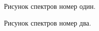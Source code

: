 \documentclass[a4paper,fleqn]{cas-dc}
\begin{document}
\begin{figure}[ht]
    \caption{Рисунок спектров номер один.}
    \label{Ris_5_UPS_1}
    \end{figure}

\lipsum[9-12]

\begin{figure}[ht]
    \caption{Рисунок спектров номер два.}
    \label{Ris_6_UPS_2}
    \end{figure}
\end{document}

